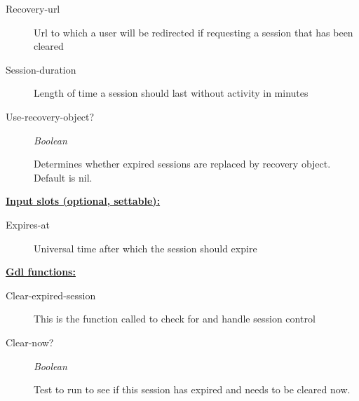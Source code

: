 \documentclass [11pt]{book}
\begin{document}
\begin{itemize}
\begin{description}
\item [Recovery-url]

Url to which a user will be redirected if requesting a session that has been cleared




\item [Session-duration]

Length of time a session should last without activity in minutes




\item [Use-recovery-object?]
\emph{Boolean}

 Determines whether expired sessions are replaced by recovery object. Default is nil.




\end{description}






\textbf{
\underline{Input slots (optional, settable):}}

\begin{description}

\item [Expires-at]

Universal time after which the session should expire




\end{description}






\textbf{
\underline{Gdl functions:}}

\begin{description}

\item [Clear-expired-session]

This is the function called to check for and handle session control




\item [Clear-now?]
\emph{Boolean}

 Test to run to see if this session has expired and needs to be cleared now.





\end{description}
\end{itemize}
\end{document}
